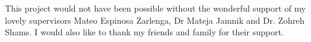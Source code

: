 \documentclass[12pt,a4paper,twoside]{report}
\begin{document}
This project would not have been possible without the wonderful
support of my lovely supervisors Mateo Espinosa Zarlenga, Dr Mateja Jamnik and Dr. Zohreh Shams. I would also like to 
thank my friends and family for their support.

\fi
\cleardoublepage %

\tableofcontents
\listoffigures
\listoftables



\pagestyle{headings}
\label{lastcontentpage}







\label{lastpage}

\end{document}
